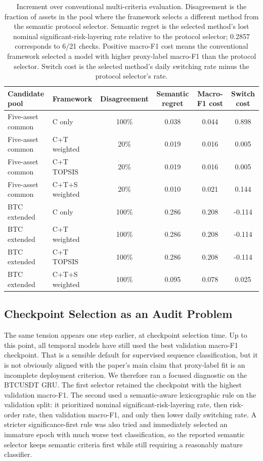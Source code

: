 \documentclass[a4paper,fleqn]{cas-dc}
\begin{document}
\begin{table}[t]
\caption{Increment over conventional multi-criteria evaluation. Disagreement is the fraction of assets in the pool where the framework selects a different method from the semantic protocol selector. Semantic regret is the selected method's lost nominal significant-risk-layering rate relative to the protocol selector; 0.2857 corresponds to 6/21 checks. Positive macro-F1 cost means the conventional framework selected a model with higher proxy-label macro-F1 than the protocol selector. Switch cost is the selected method's daily switching rate minus the protocol selector's rate.}
\label{tab:framework-increment}
\centering
\scriptsize
\setlength{\tabcolsep}{4pt}
\begin{tabular}{llcccc}
\toprule
Candidate pool & Framework & Disagreement & Semantic regret & Macro-F1 cost & Switch cost \\
\midrule
Five-asset common & C only & 100\% & 0.038 & 0.044 & 0.898 \\
Five-asset common & C+T weighted & 20\% & 0.019 & 0.016 & 0.005 \\
Five-asset common & C+T TOPSIS & 20\% & 0.019 & 0.016 & 0.005 \\
Five-asset common & C+T+S weighted & 20\% & 0.010 & 0.021 & 0.144 \\
\midrule
BTC extended & C only & 100\% & 0.286 & 0.208 & -0.114 \\
BTC extended & C+T weighted & 100\% & 0.286 & 0.208 & -0.114 \\
BTC extended & C+T TOPSIS & 100\% & 0.286 & 0.208 & -0.114 \\
BTC extended & C+T+S weighted & 100\% & 0.095 & 0.078 & 0.025 \\
\bottomrule
\end{tabular}
\end{table}

\subsection{Checkpoint Selection as an Audit Problem}
The same tension appears one step earlier, at checkpoint selection time. Up to this point, all temporal models have still used the best validation macro-F1 checkpoint. That is a sensible default for supervised sequence classification, but it is not obviously aligned with the paper's main claim that proxy-label fit is an incomplete deployment criterion. We therefore ran a focused diagnostic on the BTCUSDT GRU. The first selector retained the checkpoint with the highest validation macro-F1. The second used a semantic-aware lexicographic rule on the validation split: it prioritized nominal significant-risk-layering rate, then risk-order rate, then validation macro-F1, and only then lower daily switching rate. A stricter significance-first rule was also tried and immediately selected an immature epoch with much worse test classification, so the reported semantic selector keeps semantic criteria first while still requiring a reasonably mature classifier.
\end{document}
